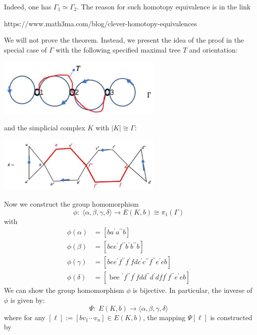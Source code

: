 Indeed, one has \({\Gamma }_{1} \simeq  {\Gamma }_{2}\). The reason for such homotopy equivalence is in the link

https://www.math3ma.com/blog/clever-homotopy-equivalences

\bigskip
We will not prove the theorem. Instead, we present the idea of the proof in the special case of \(\Gamma\) with the following specified maximal tree $T$ and orientation:
\begin{center}
\includegraphics[width=0.6\textwidth]{images/Ch8_maximal_tree_oriented.jpg}
\end{center}
and the simplicial complex $K$ with \(\left| K\right|  \cong  \Gamma\):
\begin{center}
\includegraphics[width=0.6\textwidth]{images/Ch8_simp_approx_oriented.jpg}
\end{center}
Now we construct the group homomorphism
\[
\phi : \;\langle \alpha,\beta,\gamma,\delta \rangle  \rightarrow  E\left( {K,b}\right)  \cong  {\pi }_{1}\left( \Gamma \right)
\]
with 
\begin{align*} \phi \left( \alpha \right)  &= \left\lbrack  {b{a}^{\prime }{a}^{\prime \prime }b}\right\rbrack\\ 
\phi \left( \beta \right)  &= \left\lbrack  {{be}{e}^{\prime }{f}^{\prime \prime }{b}^{\prime }{b}^{\prime \prime }b}\right\rbrack \\
\phi \left( \gamma \right)  &= \left\lbrack  {{be}{e}^{\prime }{f}^{\prime \prime }{f}^{\prime }{fd}{c}^{\prime }{c}^{\prime \prime }{f}^{\prime \prime }{e}^{\prime }{eb}}\right\rbrack
\\
\phi \left( \delta \right)  &= \left\lbrack  {{\text{ bee }}^{\prime }{f}^{\prime \prime }{f}^{\prime }{fd}{d}^{\prime \prime }{d}^{\prime }{df}{f}^{\prime }{f}^{\prime \prime }{e}^{\prime }{eb}}\right\rbrack
\end{align*}
We can show the group homomorphism \(\phi\) is bijective. In particular, the inverse of \(\phi\) is given by:
\[
\Psi : \;E\left( {K,b}\right)  \rightarrow  \langle \alpha,\beta,\gamma,\delta \rangle
\]
where for any \(\left\lbrack  \ell \right\rbrack   \mathrel{\text{:= }} \left\lbrack  {b{v}_{1}\cdots {v}_{n}}\right\rbrack   \in  E\left( {K,b}\right)\), the mapping \(\Psi \left\lbrack  \ell \right\rbrack\) is constructed by

